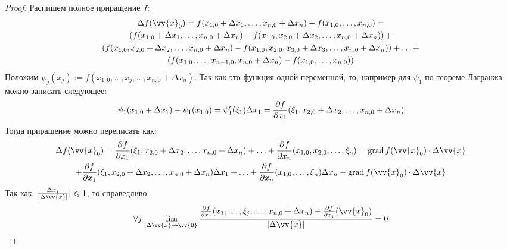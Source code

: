 \begin{proof}
	Распишем полное приращение $f$:
	\begin{multline*}
		\Delta f(\vv{x}_0) = f(x_{1, 0} + \Delta x_1, \ldots, x_{n, 0} + \Delta x_n) - f(x_{1, 0}, \ldots, x_{n, 0}) =
		\\
		\left(f(x_{1, 0} + \Delta x_1, \ldots, x_{n, 0} + \Delta x_n) - f(x_{1, 0}, x_{2, 0} + \Delta x_2, \ldots, x_{n, 0} + \Delta x_n)\right) +
		\\
		\left(f(x_{1, 0}, x_{2, 0} + \Delta x_2, \ldots, x_{n, 0} + \Delta x_n) - f(x_{1, 0}, x_{2, 0}, x_{3, 0} + \Delta x_3, \ldots, x_{n, 0} + \Delta x_n)\right) + \ldots +
		\\
		\left(f(x_{1, 0}, \ldots, x_{n - 1, 0}, x_{n, 0} + \Delta x_n) - f(x_{1, 0}, \ldots, x_{n, 0})\right)
	\end{multline*}
	Положим $\psi_j(x_j) := f(x_{1, 0}, \ldots, x_j, \ldots, x_{n, 0} + \Delta x_n)$. Так как это функция одной переменной, то, например для $\psi_1$ по теореме Лагранжа можно записать следующее:
	\[
		\psi_1(x_{1, 0} + \Delta x_1) - \psi_1(x_{1, 0}) = \psi'_1(\xi_1)\Delta x_1 = \frac{\partial f}{\partial x_1}(\xi_1, x_{2, 0} + \Delta x_2, \ldots, x_{n, 0} + \Delta x_n)
	\]
	Тогда приращение можно переписать как:
	\begin{multline*}
		\Delta f(\vv{x}_0) = \frac{\vdelta f}{\vdelta x_1}(\xi_1, x_{2, 0} + \Delta x_2, \ldots, x_{n, 0} + \Delta x_n) + \ldots + \frac{\vdelta f}{\vdelta x_n}(x_{1, 0}, x_{2, 0}, \ldots, \xi_n) = 
		\grad f(\vv{x}_0)\cdot \Delta\vv{x}\\
		+ \frac{\vdelta f}{\vdelta x_1}(\xi_1, x_{2, 0} + \Delta x_2, \ldots, x_{n, 0} + \Delta x_n) \Delta x_1 + \ldots + \frac{\vdelta f}{\vdelta x_n}(x_{1, 0}, \ldots, \xi_n)\Delta x_n - \grad f(\vv{x}_0)\cdot \Delta\vv{x}
	\end{multline*}
	Так как $|\frac{\Delta x_j}{|\Delta \vv{x}|}| \leq 1$, то справедливо
	\[
		\forall j \ \liml_{\Delta\vv{x} \to \vv{0}}\frac{\frac{\vdelta f}{\vdelta x_j}(x_1, \ldots, \xi_j, \ldots, x_{n, 0} + \Delta x_n) - \frac{\vdelta f}{\vdelta x_j}(\vv{x}_0)}{|\Delta \vv{x}|} = 0
	\]
\end{proof}